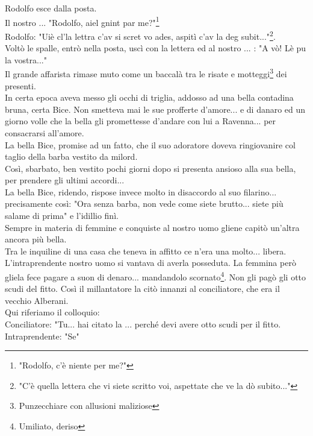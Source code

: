 Rodolfo esce dalla posta.\\
Il nostro .\:.\:.\: "Rodolfo, aiel gnint par me?"\footnote{"Rodolfo, c'è niente per me?"}\\
Rodolfo: "Uiè cl'la lettra c'av si scret vo ades, aspitì c'av la deg subit..."\footnote{"C'è quella lettera che vi siete scritto voi, aspettate che ve la dò subito..."}.\\
Voltò le spalle, entrò nella posta, uscì con la lettera ed al nostro .\:.\:.\: : "A vò! Lè pu la vostra..."\\
Il grande affarista rimase muto come un baccalà tra le risate e motteggi\footnote{Punzecchiare con allusioni maliziose} dei presenti.\\
In certa epoca aveva messo gli occhi di triglia, addosso ad una bella contadina bruna, certa Bice. Non smetteva mai le sue profferte d'amore... e di danaro ed un giorno volle che la bella gli promettesse d'andare con lui a Ravenna... per consacrarsi all'amore.\\
La bella Bice, promise ad un fatto, che il suo adoratore doveva ringiovanire col taglio della barba vestito da milord.\\
Così, sbarbato, ben vestito pochi giorni dopo si presenta ansioso alla sua bella, per prendere gli ultimi accordi...\\
La bella Bice, ridendo, rispose invece molto in disaccordo al suo filarino... precisamente così: "Ora senza barba, non vede come siete brutto... siete più salame di prima" e l'idillio finì.\\
Sempre in materia di femmine e conquiste al nostro uomo gliene capitò un'altra ancora più bella.\\
Tra le inquiline di una casa che teneva in affitto ce n'era una molto... libera. L'intraprendente nostro uomo si vantava di averla posseduta. La femmina però gliela fece pagare a suon di denaro... mandandolo scornato\footnote{Umiliato, deriso}. Non gli pagò gli otto scudi del fitto. Così il millantatore la citò innanzi al conciliatore, che era il vecchio Alberani.\\
Qui riferiamo il colloquio:\\
Conciliatore: "Tu... hai citato la .\:.\:. perché devi avere otto scudi per il fitto.\\
Intraprendente: "Se"\\
